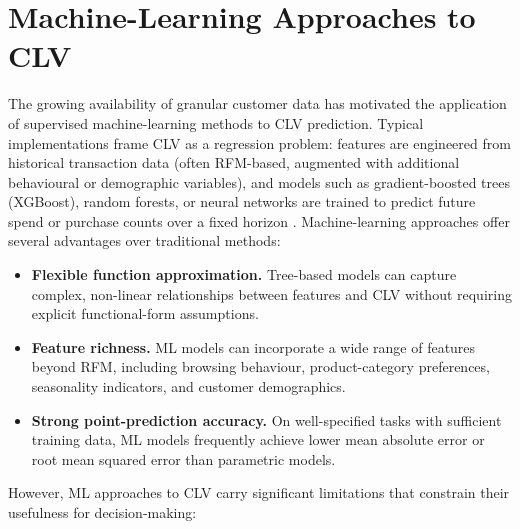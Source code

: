 \documentclass[12pt, a4paper, oneside]{report}
\begin{document}


\section{Machine-Learning Approaches to CLV}
\label{sec:ml}

The growing availability of granular customer data has motivated the application of supervised machine-learning methods to CLV prediction. Typical implementations frame CLV as a regression problem: features are engineered from historical transaction data (often RFM-based, augmented with additional behavioural or demographic variables), and models such as gradient-boosted trees (XGBoost), random forests, or neural networks are trained to predict future spend or purchase counts over a fixed horizon \parencite{chamberlain2017}. Machine-learning approaches offer several advantages over traditional methods:

\begin{itemize}
  \item \textbf{Flexible function approximation.} Tree-based models can capture complex, non-linear relationships between features and CLV without requiring explicit functional-form assumptions.
  \item \textbf{Feature richness.} ML models can incorporate a wide range of features beyond RFM, including browsing behaviour, product-category preferences, seasonality indicators, and customer demographics.
  \item \textbf{Strong point-prediction accuracy.} On well-specified tasks with sufficient training data, ML models frequently achieve lower mean absolute error or root mean squared error than parametric models.
\end{itemize}

However, ML approaches to CLV carry significant limitations that constrain their usefulness for decision-making:
\end{document}
